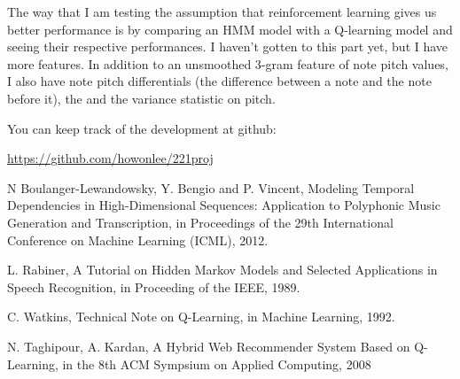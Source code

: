 \documentclass{article}
\begin{document}
The way that I am testing the assumption that reinforcement learning gives us better performance is by comparing an HMM model with a Q-learning model and seeing their respective performances. I haven't gotten to this part yet, but I have more features. In addition to an unsmoothed 3-gram feature of note pitch values, I also have note pitch differentials (the difference between a note and the note before it), the and the variance statistic on pitch.

You can keep track of the development at github:

\url{https://github.com/howonlee/221proj}

\begin{thebibliography}{9}%

N Boulanger-Lewandowsky, Y. Bengio and P. Vincent, Modeling Temporal Dependencies in High-Dimensional Sequences: Application to Polyphonic Music Generation and Transcription, in Proceedings of the 29th International Conference on Machine Learning (ICML), 2012.

L. Rabiner, A Tutorial on Hidden Markov Models and Selected Applications in Speech Recognition, in Proceeding of the IEEE, 1989.

C. Watkins, Technical Note on Q-Learning, in Machine Learning, 1992.

N. Taghipour, A. Kardan, A Hybrid Web Recommender System Based on Q-Learning, in the 8th ACM Sympsium on Applied Computing, 2008

\end{thebibliography}
\end{document}
